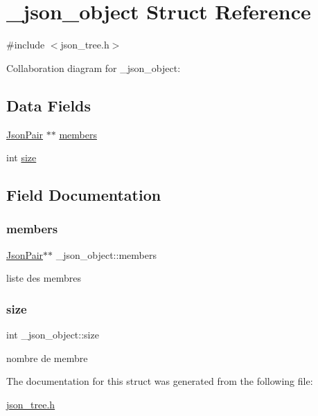 \hypertarget{struct__json__object}{}\section{\+\_\+json\+\_\+object Struct Reference}
\label{struct__json__object}


{\ttfamily \#include $<$json\+\_\+tree.\+h$>$}



Collaboration diagram for \+\_\+json\+\_\+object\+:
\subsection*{Data Fields}
\begin{DoxyCompactItemize}
\item 
\hyperlink{structJsonPair}{Json\+Pair} $\ast$$\ast$ \hyperlink{struct__json__object_a61878c36cde83d313c094bb7b2a246f0}{members}
\item 
int \hyperlink{struct__json__object_a9a4c68b8224ec222391597f4e27ea447}{size}
\end{DoxyCompactItemize}


\subsection{Field Documentation}
\mbox{\label{struct__json__object_a61878c36cde83d313c094bb7b2a246f0}} 
\subsubsection{\texorpdfstring{members}{members}}
{\footnotesize\ttfamily \hyperlink{structJsonPair}{Json\+Pair}$\ast$$\ast$ \+\_\+json\+\_\+object\+::members}

liste des membres \mbox{\label{struct__json__object_a9a4c68b8224ec222391597f4e27ea447}} 
\subsubsection{\texorpdfstring{size}{size}}
{\footnotesize\ttfamily int \+\_\+json\+\_\+object\+::size}

nombre de membre 

The documentation for this struct was generated from the following file\+:\begin{DoxyCompactItemize}
\item 
\hyperlink{json__tree_8h}{json\+\_\+tree.\+h}\end{DoxyCompactItemize}
